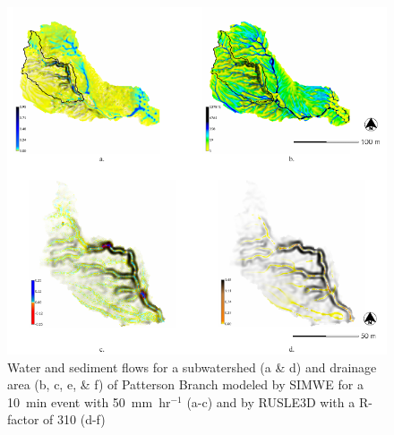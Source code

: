 \documentclass[gmd, manuscript]{copernicus}
\begin{document}
\begin{figure}
\center
\includegraphics[width=\textwidth,height=0.95\textheight,keepaspectratio]{figures/models.pdf}
\caption{Water and sediment flows
for a subwatershed (a \& d) and drainage area (b, c, e, \& f) of Patterson Branch
modeled by SIMWE 
for a 10~\unit{min} event with 50~\unit{mm~hr}$^{-1}$ (a-c)
and by RUSLE3D with a R-factor of 310 (d-f)
}
\label{fig:models}
\end{figure}

\end{document}
